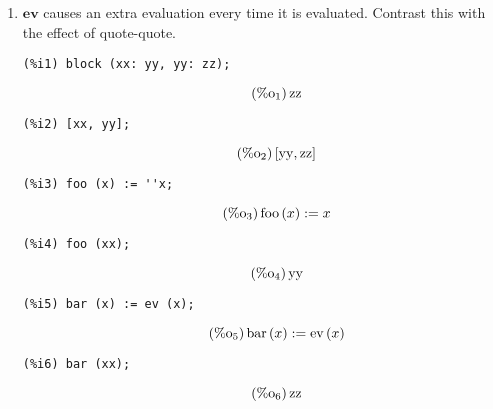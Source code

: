 \documentclass[12pt,leqno]{article}
\begin{document}
\begin{enumerate}
\item $\mathbf{ev}$ causes an extra evaluation every time it is evaluated.
Contrast this with the effect of quote-quote.
\begin{verbatim}
(%i1) block (xx: yy, yy: zz);
\end{verbatim}
\begin{equation}
\tag{$\mathop{\mathrm{\%o}}_{1}$}\mathop{\mathrm{zz}}
\label{eq:doc-group1-code18-1-1}
\end{equation}
\begin{verbatim}
(%i2) [xx, yy];
\end{verbatim}
\begin{equation}
\tag{$\mathop{\mathrm{\%o}}_{2}$}\left[\mathop{\mathrm{yy}}, \mathop{\mathrm{zz}}\right]
\label{eq:doc-group1-code18-2-1}
\end{equation}
\begin{verbatim}
(%i3) foo (x) := ''x;
\end{verbatim}
\begin{equation}
\tag{$\mathop{\mathrm{\%o}}_{3}$}\mathop{\mathrm{foo}}\left(x\right) := x
\label{eq:doc-group1-code18-3-1}
\end{equation}
\begin{verbatim}
(%i4) foo (xx);
\end{verbatim}
\begin{equation}
\tag{$\mathop{\mathrm{\%o}}_{4}$}\mathop{\mathrm{yy}}
\label{eq:doc-group1-code18-4-1}
\end{equation}
\begin{verbatim}
(%i5) bar (x) := ev (x);
\end{verbatim}
\begin{equation}
\tag{$\mathop{\mathrm{\%o}}_{5}$}\mathop{\mathrm{bar}}\left(x\right) := \mathop{\mathrm{ev}}\left(x\right)
\label{eq:doc-group1-code18-5-1}
\end{equation}
\begin{verbatim}
(%i6) bar (xx);
\end{verbatim}
\begin{equation}
\tag{$\mathop{\mathrm{\%o}}_{6}$}\mathop{\mathrm{zz}}
\label{eq:doc-group1-code18-6-1}
\end{equation}



\end{enumerate}
\end{document}
